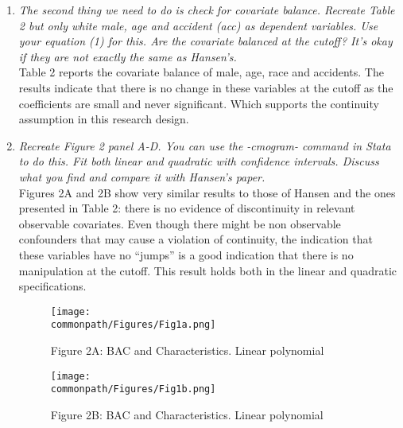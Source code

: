 \documentclass[11pt, letterpaper]{article}
\newcommand*{\commonpath}{C:/Users/Nicolás Urdaneta/Documents/GitHub/RDD}
\begin{document}
\begin{enumerate}
	\item \textit{The second thing we need to do is check for covariate balance.  Recreate Table 2 but only white male, age and accident (acc) as dependent variables.  Use your equation (1) for this. Are the covariate balanced at the cutoff?  It’s okay if they are not exactly the same as Hansen’s.} \\

	Table 2 reports the covariate balance of male, age, race and accidents. The results indicate that there is no change in these variables at the cutoff as the coefficients are small and never significant. Which supports the continuity assumption in this research design. \\ 

	

	\item \textit{Recreate Figure 2 panel A-D. You can use the -cmogram- command in Stata to do this.  Fit both linear and quadratic with confidence intervals. Discuss what you find and compare it with Hansen’s paper.} \\

	Figures 2A and 2B show very similar results to those of Hansen and the ones presented in Table 2: there is no evidence of discontinuity in relevant observable covariates. Even though there might be non observable confounders that may cause a violation of continuity, the indication that these variables have no ``jumps'' is a good indication that there is no manipulation at the cutoff. This result holds both in the linear and quadratic specifications. \\

	\begin{figure}[H]
		\centering
		\caption*{Figure 2A: BAC and Characteristics. Linear polynomial}
		\texttt{[image: \\commonpath/Figures/Fig1a.png]}
	\end{figure}
	\begin{figure}[H]
		\centering
		\caption*{Figure 2B: BAC and Characteristics. Linear polynomial}
		\texttt{[image: \\commonpath/Figures/Fig1b.png]}
	\end{figure}
	\begin{tablenotes}
		\centering
		\small
		\item Confidence intervals at 95\%.
	\end{tablenotes}


\end{enumerate}
\end{document}
